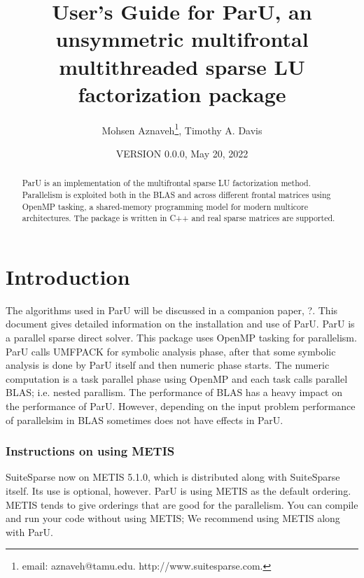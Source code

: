 \documentclass[12pt]{article}
\title{User's Guide for ParU, an unsymmetric multifrontal multithreaded sparse
LU factorization package}
\author{Mohsen Aznaveh\thanks{
email: aznaveh@tamu.edu.
http://www.suitesparse.com.
},
Timothy A. Davis}
\date{VERSION 0.0.0, May 20, 2022}
\begin{document}
\maketitle

\begin{abstract}

ParU is an implementation of the multifrontal sparse LU factorization
method.  Parallelism is exploited both in the BLAS and across different frontal
matrices using OpenMP tasking, a shared-memory programming model for modern 
multicore architectures. The package is written in C++ and real sparse matrices 
are supported.

\end{abstract}

\maketitle

\section{Introduction}
\label{intro}

The algorithms used in ParU will be discussed in a companion paper,
?. This document gives detailed information on the installation
and use of ParU.
ParU is a parallel sparse direct solver. This package uses OpenMP
tasking for parallelism. ParU calls UMFPACK for symbolic analysis phase,
after that some symbolic analysis is done by ParU itself and  then numeric
phase starts. The numeric computation is a task parallel phase using OpenMP
and each task calls parallel BLAS; i.e. nested parallism. 
The performance of BLAS has a heavy impact on the performance of ParU.
However, depending on the input problem performance of parallelsim in BLAS 
sometimes does not have effects in ParU.


\subsubsection{Instructions on using METIS}

SuiteSparse now on METIS 5.1.0, which is distributed along with
SuiteSparse itself.  Its use is optional, however. ParU is using METIS as the 
default ordering. METIS tends to give orderings that are good for the 
parallelism. You can compile and run your code without using METIS; We recommend 
using METIS along with ParU.
\end{document}
